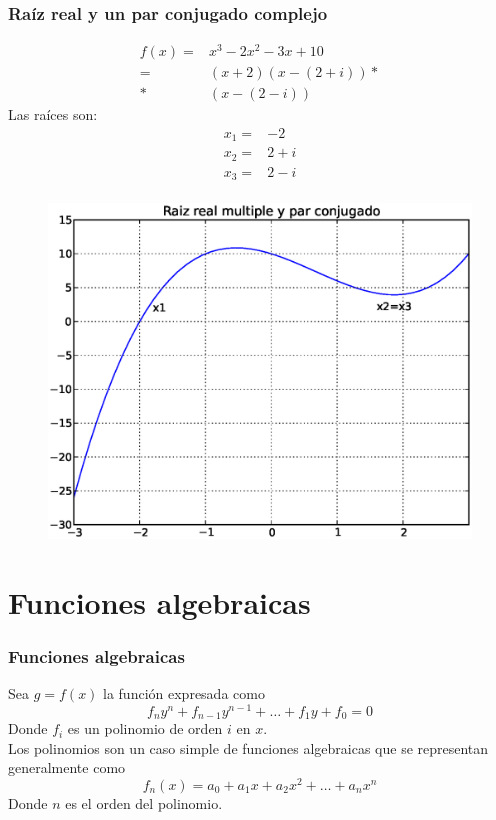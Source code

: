 \documentclass[12pt]{beamer}
\begin{document}
\begin{frame}[fragile]
\frametitle{Ra\'{i}z real y un par conjugado complejo}
\begin{minipage}{5cm}
\fontsize{12}{12}\selectfont
\[ \begin{split}
f(x)=& x^{3} - 2x^{2}- 3x +10  \\
=& (x+2)(x- (2+i))* {}\\
*& (x-(2-i))
\end{split} \]
Las ra\'{i}ces son:
\[ \begin{split}
x_{1} =& -2 \\
x_{2} =& 2+i \\
x_{3} =& 2-i \\
\end{split}\]
\end{minipage}
\hspace{0.5cm}
\begin{minipage}{4.5cm}
\begin{figure}
	\centering
	\includegraphics[scale=0.3]{raices04.eps} 
\end{figure}
\end{minipage}
\end{frame}
\section{Funciones algebraicas}
\begin{frame}
\frametitle{Funciones algebraicas}
Sea $g=f(x)$ la funci\'{o}n expresada como
\[ f_{n}y^{n} + f_{n-1}y^{n-1} + \ldots + f_{1}y + f_{0} = 0 \]
Donde $f_{i}$ es un polinomio de orden $i$ en $x$.
\\
\bigskip
Los polinomios son un caso simple de funciones algebraicas que se representan generalmente como
\[f_{n}(x) = a_{0} + a_{1}x + a_{2} x^{2}+ \ldots +a_{n}x^{n} \]
Donde $n$ es el orden del polinomio.
\end{frame}
\end{document}
